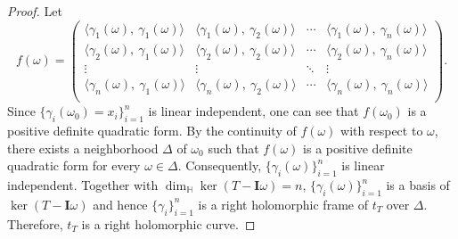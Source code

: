 \documentclass[pdflatex,sn-mathphys-num]{sn-jnl}%
\theoremstyle{thmstyleone}%
\theoremstyle{thmstyletwo}%
\theoremstyle{thmstylethree}%
\theoremstyle{definition}
\theoremstyle{remark}
\begin{document}
\begin{proof}
Let
\[
f(\omega)=\begin{pmatrix}
\langle\gamma_1(\omega),\ \gamma_1(\omega)\rangle & \langle\gamma_1(\omega),\ \gamma_2(\omega)\rangle & \cdots & \langle\gamma_1(\omega),\ \gamma_n(\omega)\rangle \\
\langle\gamma_2(\omega),\ \gamma_1(\omega)\rangle & \langle\gamma_2(\omega),\ \gamma_2(\omega)\rangle & \cdots & \langle\gamma_2(\omega),\ \gamma_n(\omega)\rangle \\
\vdots & \vdots & \ddots & \vdots \\
\langle\gamma_n(\omega),\ \gamma_1(\omega)\rangle & \langle\gamma_n(\omega),\ \gamma_2(\omega)\rangle & \cdots & \langle\gamma_n(\omega),\ \gamma_n(\omega)\rangle \\
\end{pmatrix}.
\]
Since $\{\gamma_i(\omega_0)=x_i\}_{i=1}^{n}$ is linear independent, one can see that $f(\omega_0)$ is a positive definite quadratic form. By the continuity of $f(\omega)$ with respect to $\omega$, there exists a neighborhood $\Delta$ of $\omega_0$ such that $f(\omega)$ is a positive definite quadratic form for every $\omega\in\Delta$. Consequently, $\{\gamma_i(\omega)\}_{i=1}^{n}$ is linear independent. Together with $\dim_{\mathbb{H}}{\ker(T-\boldsymbol{I}\omega)}=n$, $\{\gamma_i(\omega)\}_{i=1}^{n}$ is a basis of $\ker(T-\boldsymbol{I}\omega)$ and  hence
$\{\gamma_i\}_{i=1}^{n}$ is a right holomorphic frame of $t_T$ over $\Delta$. Therefore, $t_T$ is a right holomorphic curve.
		\end{proof}
\end{document}
